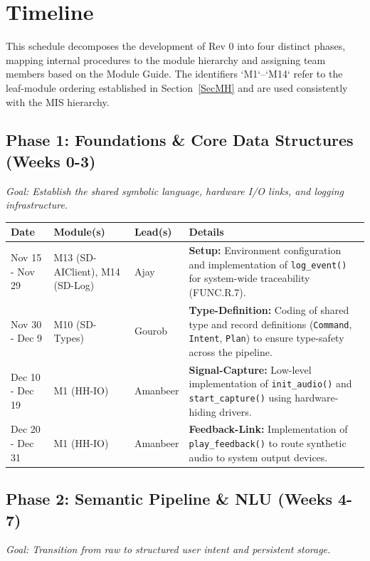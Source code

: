\documentclass[12pt, titlepage]{article}
\begin{document}
\section{Timeline}

This schedule decomposes the development of Rev 0 into four distinct phases, 
mapping internal procedures to the module hierarchy and assigning team members 
based on the Module Guide. The identifiers `M1`--`M14` refer to the leaf-module
ordering established in Section~\ref{SecMH} and are used consistently with the
MIS hierarchy.

\subsection{Phase 1: Foundations \& Core Data Structures (Weeks 0-3)}
\textit{Goal: Establish the shared symbolic language, hardware I/O links, and 
logging infrastructure.}

\begin{tabularx}{\textwidth}{|>{\raggedright\arraybackslash}p{}|>{\raggedright\arraybackslash}p{}|>{\raggedright\arraybackslash}p{}|>{\raggedright\arraybackslash}X|}
\hline
\textbf{Date} & \textbf{Module(s)} & \textbf{Lead(s)} & \textbf{Details} 
\\ \hline
Nov 15 - Nov 29  & M13 (SD-AIClient), M14 (SD-Log) & Ajay & \textbf{Setup:} Environment configuration and 
implementation of \texttt{log\_event()} for system-wide traceability 
(FUNC.R.7). \\ \hline
Nov 30 - Dec 9 & M10 (SD-Types) & Gourob & \textbf{Type-Definition:} Coding of shared 
type and record definitions (\texttt{Command}, \texttt{Intent}, \texttt{Plan}) to ensure type-safety 
across the pipeline. \\ \hline
Dec 10 - Dec 19 & M1 (HH-IO) & Amanbeer & \textbf{Signal-Capture:} Low-level implementation 
of \texttt{init\_audio()} and \texttt{start\_capture()} using hardware-hiding 
drivers. \\ \hline
Dec 20 - Dec 31 & M1 (HH-IO) & Amanbeer & \textbf{Feedback-Link:} Implementation 
of \texttt{play\_feedback()} to route synthetic audio to system output devices. 
\\ \hline
\end{tabularx}

\subsection{Phase 2: Semantic Pipeline \& NLU (Weeks 4-7)}
\textit{Goal: Transition from raw  to structured user intent and 
persistent storage.}
\end{document}
